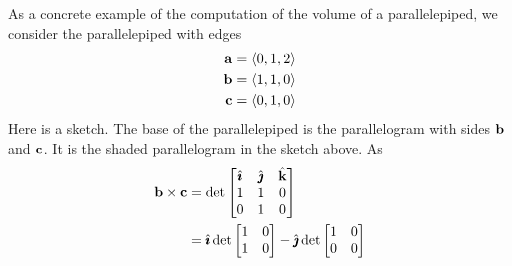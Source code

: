 \begin{eg}\label{eg:GEOcrossConcrete}
As a concrete example of the computation of the volume of a parallelepiped,
we consider the parallelepiped with edges
\begin{align*}
\mathbf{a} &= \left< 0,1,2\right> \\
\mathbf{b} &= \left< 1,1,0\right> \\
\mathbf{c} &= \left< 0,1,0\right>
\end{align*}
Here is a sketch.
%
The base of the parallelepiped is the parallelogram with sides $\mathbf{b}$ and $\mathbf{c}$.
It is the shaded parallelogram in the sketch above. As
\begin{align*}
\vb\times\vc
&=\det\left[\begin{matrix}\hi& \hj &\hk\\ 
                            1&1&0\\ 
                            0&1&0\end{matrix}\right] \\
&=\hi\det\left[\begin{matrix} 1&0\\ 
                              1&0\end{matrix}\right]
  -\hj\det\left[\begin{matrix}1&0\\ 
                              0&0\end{matrix}\right] 

\end{align*}
\end{eg}
